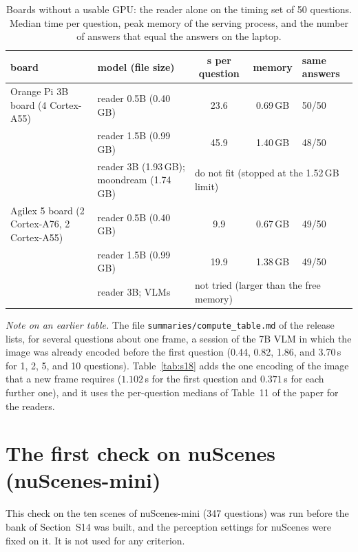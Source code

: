 \documentclass[10pt]{article}
\renewcommand{\thetable}{S\arabic{table}}
\newcommand{\fixtab}[1]{\renewcommand{\thetable}{#1}}
\begin{document}
\fixtab{S8d}\begin{table}[h]\centering\footnotesize
\caption{Boards without a usable GPU: the reader alone on the timing set of 50 questions. Median time per question, peak memory of the serving process, and the number of answers that equal the answers on the laptop.}\label{tab:s8d}
\begin{tabular}{@{}llccl@{}}
\toprule
board & model (file size) & s per question & memory & same answers \\
\midrule
Orange Pi 3B board (4 Cortex-A55) & reader 0.5B (0.40\,GB) & 23.6 & 0.69\,GB & 50/50 \\
 & reader 1.5B (0.99\,GB) & 45.9 & 1.40\,GB & 48/50 \\
 & reader 3B (1.93\,GB); moondream (1.74\,GB) & \multicolumn{3}{l}{do not fit (stopped at the 1.52\,GB limit)} \\
Agilex 5 board (2 Cortex-A76, 2 Cortex-A55) & reader 0.5B (0.40\,GB) & 9.9 & 0.67\,GB & 49/50 \\
 & reader 1.5B (0.99\,GB) & 19.9 & 1.38\,GB & 49/50 \\
 & reader 3B; VLMs & \multicolumn{3}{l}{not tried (larger than the free memory)} \\
\bottomrule
\end{tabular}
\end{table}

\emph{Note on an earlier table.} The file \texttt{summaries/compute\_table.md} of the release lists, for several questions about one frame, a session of the 7B VLM in which the image was already encoded before the first question (0.44, 0.82, 1.86, and 3.70\,s for 1, 2, 5, and 10 questions). Table~\ref{tab:s18} adds the one encoding of the image that a new frame requires ($1.102$\,s for the first question and $0.371$\,s for each further one), and it uses the per-question medians of Table~11 of the paper for the readers.

\section{The first check on nuScenes (nuScenes-mini)}
This check on the ten scenes of nuScenes-mini (347 questions) was run before the bank of Section~S14 was built, and the perception settings for nuScenes were fixed on it. It is not used for any criterion.
\end{document}
